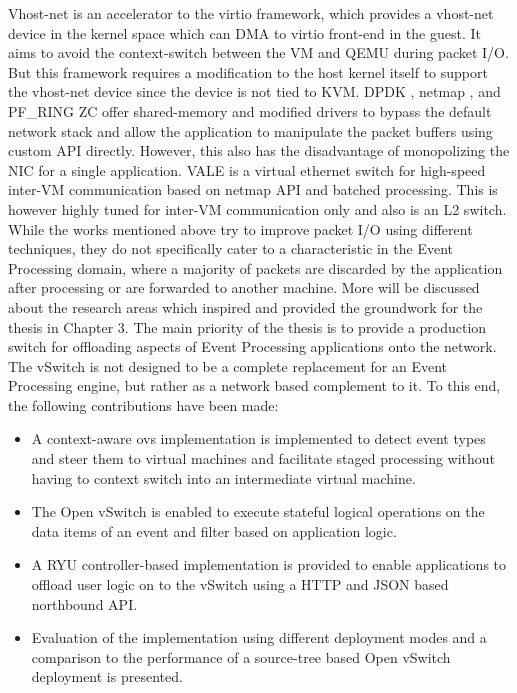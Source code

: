 Vhost-net is an accelerator to the virtio framework, which provides a vhost-net device in the kernel space which can DMA to virtio front-end in the guest. It aims to avoid the context-switch between the VM and QEMU during packet I/O. But this framework requires a modification to the host kernel itself to support the vhost-net device since the device is not tied to KVM.  DPDK \citep{scholz2014look}, netmap \cite{rizzo2012netmap}, and PF_RING ZC \cite{kim2017study} offer shared-memory and modified drivers to bypass the default network stack and allow the application to manipulate the packet buffers using custom API directly. However, this also has the disadvantage of monopolizing the NIC for a single application. VALE \cite{Rizzo:2012:VSE:2413176.2413185} is a virtual ethernet switch for high-speed inter-VM communication based on netmap API and batched processing. This is however highly tuned for inter-VM communication only and also is an L2 switch. While the works mentioned above try to improve packet I/O using different techniques, they do not specifically cater to a characteristic in the Event Processing domain, where a majority of packets are discarded by the application after processing or are forwarded to another machine. More will be discussed about the research areas which inspired and provided the groundwork for the thesis in Chapter 3.
\newline \newline
The main priority of the thesis is to provide a production switch for offloading aspects of Event Processing applications onto the network. The vSwitch is not designed to be a complete replacement for an Event Processing engine, but rather as a network based complement to it. To this end, the following contributions have been made:
\begin{itemize}
 \item A context-aware \ac{ovs} implementation is implemented to detect event types and steer them to virtual machines and facilitate staged processing without having to context switch into an intermediate virtual machine.
 \item The Open vSwitch is enabled to execute stateful logical operations on the data items of an event and filter based on application logic. 
 \item A RYU controller-based implementation is provided to enable applications to offload user logic on to the vSwitch using a HTTP and JSON based northbound API.
 \item Evaluation of the implementation using different deployment modes and a comparison to the performance of a source-tree based Open vSwitch deployment is presented.
\end{itemize} 



